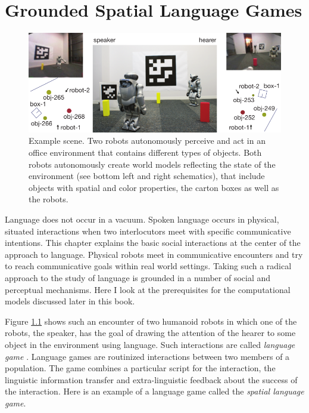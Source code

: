%


\chapter{Grounded Spatial Language Games}
\label{s:spatial-language-games}
\begin{figure}
\begin{center}
\includegraphics[width=1.0\columnwidth]{figs/space-scene-2-small}
\end{center}
\caption[Example spatial setup]{Example scene. 
Two robots autonomously perceive and act in an office 
environment that contains different types of objects. Both 
robots autonomously create world models reflecting the state 
of the environment (see bottom left and right schematics), that 
include objects with spatial and color properties, the carton boxes 
as well as the robots.}
\label{f:scene}
\end{figure}

Language does not occur in a vacuum. Spoken language occurs in physical,
situated interactions when two interlocutors meet with specific
communicative intentions. This chapter explains the basic social interactions 
at the center of the approach to language. Physical robots meet in communicative
encounters and try to reach communicative goals within real world settings. 
Taking such a radical approach to the study of language is grounded in a number of
social and perceptual mechanisms. Here I look at the prerequisites for 
the computational models discussed later in this book.

Figure \ref{f:scene} shows such an encounter of
two humanoid robots in which one of the robots, the speaker, has the goal
of drawing the attention of the hearer to some object in the environment using language.
Such interactions are called \emph{language game} \citep{steels2001language}.
Language games are routinized interactions between two members of 
a population. The game combines a particular script for the interaction, the linguistic
information transfer and extra-linguistic feedback about the success of the interaction.
Here is an example of a language game called the \emph{spatial language game}.


